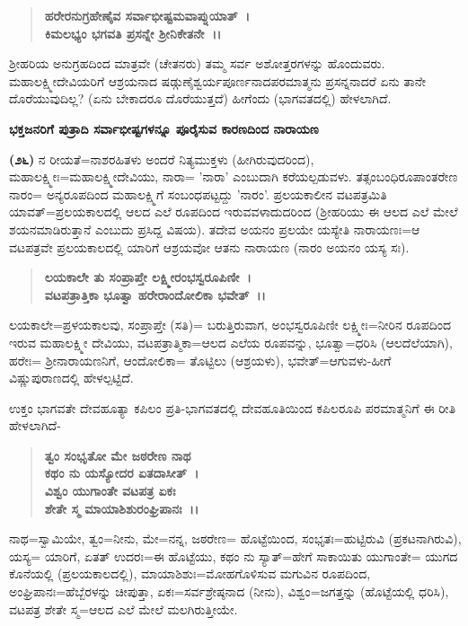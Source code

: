 \begin{verse}
\textbf{ಹರೇರನುಗ್ರಹೇಣೈವ ಸರ್ವಾಭೀಷ್ಟಮವಾಪ್ನುಯಾತ್~।}\\\textbf{ಕಿಮಲಭ್ಯಂ ಭಗವತಿ ಪ್ರಸನ್ನೇ ಶ‍್ರೀನಿಕೇತನೇ~।।}
\end{verse}

ಶ‍್ರೀಹರಿಯ ಅನುಗ್ರಹದಿಂದ ಮಾತ್ರವೇ (ಚೇತನರು) ತಮ್ಮ ಸರ್ವ ಅಶೋತ್ತರಗಳನ್ನು ಹೊಂದುವರು. ಮಹಾಲಕ್ಷ್ಮೀದೇವಿಯರಿಗೆ ಆಶ್ರಯನಾದ ಷಡ್ಗುಣೈಶ್ವರ್ಯಪೂರ್ಣನಾದ\break ಪರಮಾತ್ಮನು ಪ್ರಸನ್ನನಾದರೆ ಏನು ತಾನೇ ದೊರೆಯುವುದಿಲ್ಲ? (ಏನು ಬೇಕಾದರೂ ದೊರೆಯುತ್ತದೆ) ಹೀಗೆಂದು (ಭಾಗವತದಲ್ಲಿ) ಹೇಳಲಾಗಿದೆ.

\begin{center}
\textbf{ಭಕ್ತಜನರಿಗೆ ಪುತ್ರಾದಿ ಸರ್ವಾಭೀಷ್ಟಗಳನ್ನೂ ಪೂರೈಸುವ ಕಾರಣದಿಂದ ನಾರಾಯಣ}
\end{center}

\textbf{(೨೬)} ನ ರೀಯತೆ=ನಾಶರಹಿತಳು ಅಂದರೆ ನಿತ್ಯಮುಕ್ತಳು (ಹೀಗಿರುವುದರಿಂದ), ಮಹಾಲಕ್ಷ್ಮೀಃ=ಮಹಾಲಕ್ಷ್ಮೀದೇವಿಯು, ನಾರಾ= 'ನಾರಾ' ಎಂಬುದಾಗಿ ಕರೆಯಲ್ಪಡುವಳು. ತತ್ಸಂಬಂಧಿರೂಪಾಂತರೇಣ ನಾರಂ= ಅನ್ಯರೂಪದಿಂದ ಮಹಾಲಕ್ಷ್ಮಿಗೆ ಸಂಬಂಧಪಟ್ಟದ್ದು 'ನಾರಂ'. ಪ್ರಲಯಕಾಲೀನ ವಟಪತ್ರಮಿತಿ ಯಾವತ್=ಪ್ರಲಯಕಾಲದಲ್ಲಿ ಆಲದ ಎಲೆ ರೂಪದಿಂದ ಇರುವವಳಾದುದರಿಂದ (ಶ‍್ರೀಹರಿಯು ಈ ಆಲದ ಎಲೆ ಮೇಲೆ ಶಯನಮಾಡಿರುತ್ತಾನೆ ಎಂಬುದು ಪ್ರಸಿದ್ದ ವಿಷಯ). ತದೇವ ಅಯನಂ ಪ್ರಲಯೇ ಯಸ್ಯೇತಿ ನಾರಾಯಣಃ=ಆ ವಟಪತ್ರವೇ ಪ್ರಲಯಕಾಲದಲ್ಲಿ ಯಾರಿಗೆ ಆಶ್ರಯವೋ ಆತನು ನಾರಾಯಣ (ನಾರಂ ಅಯನಂ ಯಸ್ಯ ಸಃ).

\begin{verse}
\textbf{ಲಯಕಾಲೇ ತು ಸಂಪ್ರಾಪ್ತೇ ಲಕ್ಷ್ಮೀರಂಭಸ್ವರೂಪಿಣೀ~।}\\\textbf{ವಟಪತ್ರಾತ್ತಿಕಾ ಭೂತ್ವಾ ಹರೇರಾಂದೋಲಿಕಾ ಭವೇತ್~।।}
\end{verse}


ಲಯಕಾಲೇ=ಪ್ರಳಯಕಾಲವು, ಸಂಪ್ರಾಪ್ತೇ (ಸತಿ)= ಬರುತ್ತಿರುವಾಗ, ಅಂಭಸ್ವರೂಪಿಣೀ ಲಕ್ಷ್ಮೀಃ=ನೀರಿನ ರೂಪದಿಂದ ಇರುವ ಮಹಾಲಕ್ಷ್ಮೀ ದೇವಿಯು, ವಟಪತ್ರಾತ್ಮಿಕಾ=ಆಲದ ಎಲೆಯ ರೂಪವನ್ನು, ಭೂತ್ವಾ=ಧರಿಸಿ (ಆಲದೆಲೆಯಾಗಿ), ಹರೇಃ= ಶ‍್ರೀನಾರಾಯಣನಿಗೆ, ಆಂದೋಲಿಕಾ= ತೊಟ್ಟಿಲು (ಆಶ್ರಯಳು), ಭವೇತ್=ಆಗುವಳು-ಹೀಗೆ ವಿಷ್ಣುಪುರಾಣದಲ್ಲಿ ಹೇಳಲ್ಪಟ್ಟಿದೆ.

ಉಕ್ತಂ ಭಾಗವತೇ ದೇವಹೂತ್ಯಾ ಕಪಿಲಂ ಪ್ರತಿ-ಭಾಗವತದಲ್ಲಿ ದೇವಹೂತಿಯಿಂದ ಕಪಿಲರೂಪಿ ಪರಮಾತ್ಮನಿಗೆ ಈ ರೀತಿ ಹೇಳಲಾಗಿದೆ-

\begin{verse}
\textbf{ತ್ವಂ ಸಂಭೃತೋ ಮೇ ಜಠರೇಣ ನಾಥ}\\\textbf{ಕಥಂ ನು ಯಸ್ಯೋದರ ಏತದಾಸೀತ್~।}\\\textbf{ವಿಶ್ವಂ ಯುಗಾಂತೇ ವಟಪತ್ರ ಏಕಃ}\\\textbf{ಶೇತೇ ಸ್ಮ ಮಾಯಾಶಿಶುರಂಘ್ರಿಪಾನಃ~।।}
\end{verse}

ನಾಥ=ಸ್ವಾಮಿಯೇ, ತ್ವಂ=ನೀನು, ಮೇ=ನನ್ನ, ಜಠರೇಣ= ಹೊಟ್ಟೆಯಿಂದ, ಸಂಭೃತಃ\-=ಹುಟ್ಟಿರುವಿ (ಪ್ರಕಟನಾಗಿರುವಿ), ಯಸ್ಯ= ಯಾರಿಗೆ, ಏತತ್ ಉದರಃ=ಈ ಹೊಟ್ಟೆಯು, ಕಥಂ ನು ಸ್ಯಾತ್=ಹೇಗೆ ಸಾಕಾಯಿತು ಯುಗಾಂತೇ= ಯುಗದ ಕೊನೆಯಲ್ಲಿ (ಪ್ರಲಯಕಾಲದಲ್ಲಿ), ಮಾಯಾಶಿಶುಃ=ಮೋಹಗೊಳಿಸುವ ಮಗುವಿನ ರೂಪದಿಂದ, ಅಂಘ್ರಿಪಾನಃ=ಹೆಬ್ಬೆರ\-ಳನ್ನು ಚೀಪುತ್ತಾ, ಏಕಃ=ಸರ್ವಶ್ರೇಷ್ಠನಾದ (ನೀನು), ವಿಶ್ವಂ=ಜಗತ್ತನ್ನು (ಹೊಟ್ಟೆಯಲ್ಲಿ ಧರಿಸಿ), ವಟಪತ್ರ ಶೇತೇ ಸ್ಮ=ಆಲದ ಎಲೆ ಮೇಲೆ ಮಲಗಿರುತ್ತೀಯೇ.

